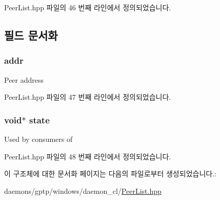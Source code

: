 Peer\+List.\+hpp 파일의 46 번째 라인에서 정의되었습니다.



\subsection{필드 문서화}
\subsubsection[{\texorpdfstring{addr}{addr}}]{ addr}\hypertarget{struct_peer_addr_with_state_a2fac2b1fbbf46cf80895a34807da1e5f}{}\label{struct_peer_addr_with_state_a2fac2b1fbbf46cf80895a34807da1e5f}
Peer address 

Peer\+List.\+hpp 파일의 47 번째 라인에서 정의되었습니다.

\subsubsection[{\texorpdfstring{state}{state}}]{\setlength{\rightskip}{0pt plus 5cm}void$\ast$ state}\hypertarget{struct_peer_addr_with_state_a441a9214dea76f74bf9d8b392cf4d355}{}\label{struct_peer_addr_with_state_a441a9214dea76f74bf9d8b392cf4d355}
Used by consumers of 

Peer\+List.\+hpp 파일의 48 번째 라인에서 정의되었습니다.



이 구조체에 대한 문서화 페이지는 다음의 파일로부터 생성되었습니다.\+:\begin{DoxyCompactItemize}
\item 
daemons/gptp/windows/daemon\+\_\+cl/\hyperlink{_peer_list_8hpp}{Peer\+List.\+hpp}\end{DoxyCompactItemize}
